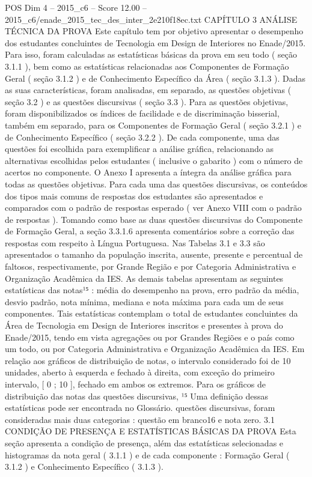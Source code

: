 \begin{textsample}{POS Dim 4 – 2015\_c6 – Score 12.00 – 2015\_c6/enade\_2015\_tec\_des\_inter\_2e210f18ec.txt}  \label{ex:f4_pos_028}
CAPÍTULO 3 ANÁLISE TÉCNICA DA PROVA Este capítulo tem por objetivo apresentar o desempenho dos estudantes concluintes de Tecnologia em Design de Interiores no Enade/2015.
Para isso, foram calculadas as estatísticas básicas da prova em seu todo ( seção 3.1.1 ), bem como as estatísticas relacionadas aos Componentes de Formação Geral ( seção 3.1.2 ) e de Conhecimento Específico da Área ( seção 3.1.3 ).
Dadas as suas características, foram analisadas, em separado, as questões objetivas ( seção 3.2 ) e as questões discursivas ( seção 3.3 ).
Para as questões objetivas, foram disponibilizados os índices de facilidade e de discriminação bisserial, também em separado, para os Componentes de Formação Geral ( seção 3.2.1 ) e de Conhecimento Específico ( seção 3.2.2 ).
De cada componente, uma das questões foi escolhida para exemplificar a análise gráfica, relacionando as alternativas escolhidas pelos estudantes ( inclusive o gabarito ) com o número de acertos no componente.
O Anexo I apresenta a íntegra da análise gráfica para todas as questões objetivas.
Para cada uma das questões discursivas, os conteúdos dos tipos mais comuns de respostas dos estudantes são apresentados e comparados com o padrão de respostas esperado ( ver Anexo VIII com o padrão de respostas ).
Tomando como base as duas questões discursivas do Componente de Formação Geral, a seção 3.3.1.6 apresenta comentários sobre a correção das respostas com respeito à Língua Portuguesa.
Nas Tabelas 3.1 e 3.3 são apresentados o tamanho da população inscrita, ausente, presente e percentual de faltosos, respectivamente, por Grande Região e por Categoria Administrativa e Organização Acadêmica da IES.
As demais tabelas apresentam as seguintes estatísticas das notas¹⁵ : média do desempenho na prova, erro padrão da média, desvio padrão, nota mínima, mediana e nota máxima para cada um de seus componentes.
Tais estatísticas contemplam o total de estudantes concluintes da Área de Tecnologia em Design de Interiores inscritos e presentes à prova do Enade/2015, tendo em vista agregações ou por Grandes Regiões e o país como um todo, ou por Categoria Administrativa e Organização Acadêmica da IES.
Em relação aos gráficos de distribuição de notas, o intervalo considerado foi de 10 unidades, aberto à esquerda e fechado à direita, com exceção do primeiro intervalo, [ 0 ; 10 ], fechado em ambos os extremos.
Para os gráficos de distribuição das notas das questões discursivas, ¹⁵ Uma definição dessas estatísticas pode ser encontrada no Glossário. questões discursivas, foram consideradas mais duas categorias : questão em branco16 e nota zero. 3.1 CONDIÇÃO DE PRESENÇA E ESTATÍSTICAS BÁSICAS DA PROVA Esta seção apresenta a condição de presença, além das estatísticas selecionadas e histogramas da nota geral ( 3.1.1 ) e de cada componente : Formação Geral ( 3.1.2 ) e Conhecimento Específico ( 3.1.3 ).

\end{textsample}
